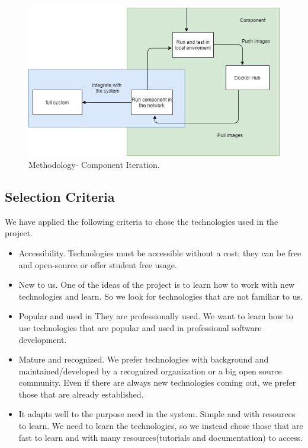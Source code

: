 \begin{figure}
	\begin{center}
		\includegraphics[width=120mm,scale=1]{img/metodology/component-teration.png}
		\caption{Methodology- Component Iteration.}
		\label{methodology:cycle}
	\end{center}
	
\end{figure}

\subsection{Selection Criteria}
\label{sel:criteria}
\indent
\indent
We have applied the following criteria to chose the technologies used in the project.
\begin{itemize}
	
	
	\item Accessibility. Technologies must be accessible without a cost; they can be free and open-source or offer student free usage.
	\item New to us. One of the ideas of the project is to learn how to work with new technologies and learn. So we look for technologies that are not familiar to us.
	
	\item Popular and used in 
	They are professionally used. We want to learn how to use technologies that are popular and used in professional software development.
	
	\item Mature and recognized. We prefer technologies with background and maintained/developed by a recognized organization or a big open source community. Even if there are always new technologies coming out, we prefer those that are already established.
	
	\item It adapts well to the purpose need in the system.
	Simple and with resources to learn. We need to learn the technologies, so we instead chose those that are fast to learn and with many resources(tutorials and documentation) to access.
\end{itemize}

